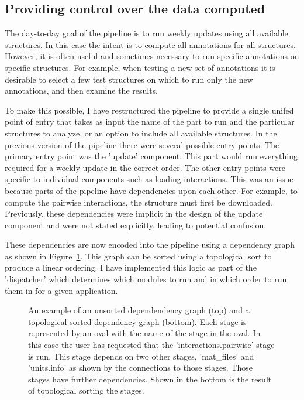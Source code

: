\subsection{Providing control over the data computed}

The day-to-day goal of the pipeline is to run weekly updates using all available
structures. In this case the intent is to compute all annotations for all
structures. However, it is often useful and sometimes necessary to run specific
annotations on specific structures. For example, when testing a new set of
annotations it is desirable to select a few test structures on which to run only
the new annotations, and then examine the results.

To make this possible, I have restructured the pipeline to provide a single
unifed point of entry that takes as input the name of the part to run and the
particular structures to analyze, or an option to include all available
structures. In the previous version of the pipeline there were several possible
entry points. The primary entry point was the 'update' component. This part
would run everything required for a weekly update in the correct order. The
other entry points were specific to individual components such as loading
interactions. This was an issue because parts of the pipeline have dependencies
upon each other. For example, to compute the pairwise interactions, the
structure must first be downloaded. Previously, these dependencies were implicit
in the design of the update component and were not stated explicitly, leading to
potential confusion.

These dependencies are now encoded into the pipeline using a dependency graph as
shown in Figure~\ref{fig:stage-deps}. This graph can be sorted using a topological
sort to produce a linear ordering. I have implemented this logic as part of the
'dispatcher' which determines which modules to run and in which order to run
them in for a given application.


\begin{figure}
\caption{An example of an unsorted dependendency graph (top) and a topological
  sorted dependency graph (bottom). Each stage is represented by an oval with
  the name of the stage in the oval. In this case the user has requested that
  the 'interactions.pairwise' stage is run. This stage depends on two other
stages, 'mat\_files' and 'units.info' as shown by the connections to those
stages. Those stages have further dependencies. Shown in the bottom is the
result of topological sorting the stages.}
\label{fig:stage-deps}
\end{figure}

